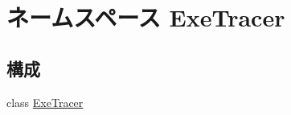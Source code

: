 \hypertarget{namespaceExeTracer}{
\section{ネームスペース ExeTracer}
\label{namespaceExeTracer}
}
\subsection*{構成}
\begin{DoxyCompactItemize}
\item 
class \hyperlink{classExeTracer_1_1ExeTracer}{ExeTracer}
\end{DoxyCompactItemize}
